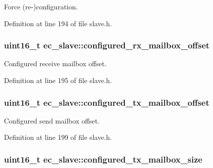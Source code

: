 Force (re-\/)configuration. 



Definition at line 194 of file slave.\-h.

\subsubsection[{configured\-\_\-rx\-\_\-mailbox\-\_\-offset}]{\setlength{\rightskip}{0pt plus 5cm}uint16\-\_\-t ec\-\_\-slave\-::configured\-\_\-rx\-\_\-mailbox\-\_\-offset}\label{structec__slave_a885011c3377eacc3513c7806db9ea4d4}


Configured receive mailbox offset. 



Definition at line 195 of file slave.\-h.

\subsubsection[{configured\-\_\-tx\-\_\-mailbox\-\_\-offset}]{\setlength{\rightskip}{0pt plus 5cm}uint16\-\_\-t ec\-\_\-slave\-::configured\-\_\-tx\-\_\-mailbox\-\_\-offset}\label{structec__slave_a365e2116bd54803112c56cb3a98970cb}


Configured send mailbox offset. 



Definition at line 199 of file slave.\-h.

\subsubsection[{configured\-\_\-tx\-\_\-mailbox\-\_\-size}]{\setlength{\rightskip}{0pt plus 5cm}uint16\-\_\-t ec\-\_\-slave\-::configured\-\_\-tx\-\_\-mailbox\-\_\-size}\label{structec__slave_a79ecaa06844f2b8bf2d1b4d9bfae9207}


